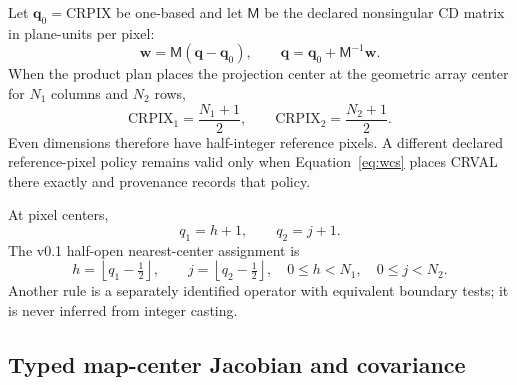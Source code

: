 Let $\boldsymbol q_0=\mathrm{CRPIX}$ be one-based and let $\mathsf M$ be the
declared nonsingular CD matrix in plane-units per pixel:
\begin{equation}
 \boldsymbol w=\mathsf M(\boldsymbol q-\boldsymbol q_0),\qquad
 \boldsymbol q=\boldsymbol q_0+\mathsf M^{-1}\boldsymbol w.
 \label{eq:wcs}
\end{equation}
When the product plan places the projection center at the geometric array
center for $N_1$ columns and $N_2$ rows,
\begin{equation}
 \mathrm{CRPIX}_1=\frac{N_1+1}{2},\qquad
 \mathrm{CRPIX}_2=\frac{N_2+1}{2}.
 \label{eq:crpix}
\end{equation}
Even dimensions therefore have half-integer reference pixels.  A different
declared reference-pixel policy remains valid only when Equation~\ref{eq:wcs}
places CRVAL there exactly and provenance records that policy.

At pixel centers,
\begin{equation}
 q_1=h+1,\qquad q_2=j+1.
 \label{eq:index-base}
\end{equation}
The v0.1 half-open nearest-center assignment is
\begin{equation}
 h=\left\lfloor q_1-\tfrac12\right\rfloor,\qquad
 j=\left\lfloor q_2-\tfrac12\right\rfloor,
 \quad 0\leq h<N_1,\quad0\leq j<N_2.
 \label{eq:pixel-assignment}
\end{equation}
Another rule is a separately identified operator with equivalent boundary
tests; it is never inferred from integer casting.

\subsection{Typed map-center Jacobian and covariance}

